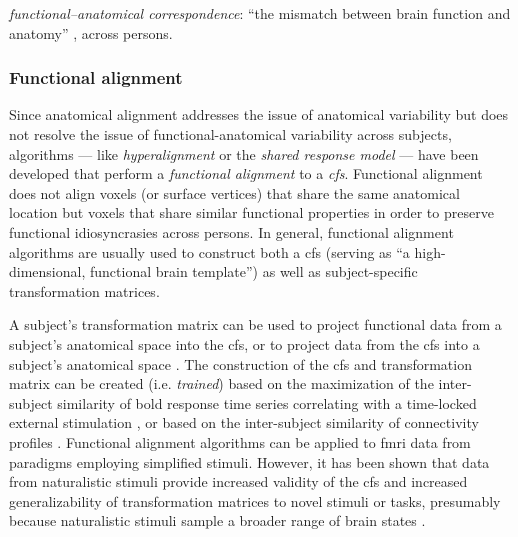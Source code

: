 %
\textit{functional--anatomical correspondence}: ``the mismatch between brain
function and anatomy'' \citep{feilong2018reliable}, across persons.



\subsubsection{Functional alignment}





Since anatomical alignment addresses the issue of anatomical variability but
does not resolve the issue of functional-anatomical variability across subjects,
algorithms --- like \textit{hyperalignment} \citep{haxby2011common,
guntupalli2016model} or the \textit{shared response model}
\citep{chen2015reduced, zhang2016searchlight} --- have been developed that
perform a \textit{functional alignment} to a \textit{\ac{cfs}}.
%
Functional alignment does not align voxels (or surface vertices) that share the
same anatomical location but voxels that share similar functional properties in
order to preserve functional idiosyncrasies across persons.
%
In general, functional alignment algorithms are usually used to construct both a
\ac{cfs} (serving as ``a high-dimensional, functional brain template'') as well
as subject-specific transformation matrices.

%
A subject's transformation matrix can be used to project functional data from a
subject's anatomical space into the \ac{cfs}, or to project data from the
\ac{cfs} into a subject's anatomical space \citep{haxby2020hyperalignment}.
%
The construction of the \ac{cfs} and transformation matrix can be created (i.e.
\textit{trained}) based on the maximization of the inter-subject similarity of
\ac{bold} response time series correlating with a time-locked external
stimulation \citep{haxby2011common, chen2015reduced, sabuncu2010function}, or
based on the inter-subject similarity of connectivity profiles
\citep{feilong2018reliable, guntupalli2018computational, nastase2019leveraging}.
%
Functional alignment algorithms can be applied to \ac{fmri} data from paradigms
employing simplified stimuli.
%
However, it has been shown that data from naturalistic stimuli provide increased
validity of the \ac{cfs} and increased generalizability of transformation
matrices to novel stimuli or tasks, presumably because naturalistic stimuli
sample a broader range of brain states \citep{haxby2011common,
guntupalli2016model}.


